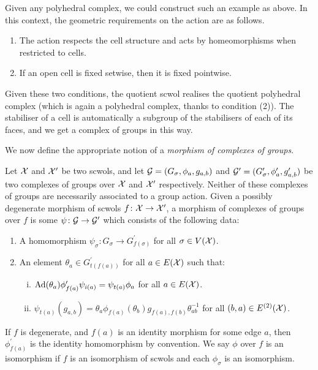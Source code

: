 Given any polyhedral complex, we could construct such an example as above.
In this context, the geometric requirements on the action are as follows.
\begin{enumerate}
	\item The action respects the cell structure and acts by homeomorphisms when restricted to cells.
	\item If an open cell is fixed setwise, then it is fixed pointwise.
\end{enumerate}
Given these two conditions, the quotient scwol realises the quotient polyhedral complex (which is again a polyhedral complex, thanks to condition (2)).
The stabiliser of a cell is automatically a subgroup of the stabilisers of each of its faces, and we get a complex of groups in this way.

We now define the appropriate notion of a \emph{morphism of complexes of groups}.

\begin{definition}
	Let $\mathcal{X}$ and $\mathcal{X}^\prime$ be two scwols, and let $\mathcal{G} = (G_\sigma, \phi_a, g_{a,b})$ and  $\mathcal{G}^\prime = (G^\prime_\sigma, \phi^\prime_a, g^\prime_{a,b})$ be two complexes of groups over $\mathcal{X}$ and $\mathcal{X}^\prime$ respectively.
	Neither of these complexes of groups are necessarily associated to a group action.
	Given a possibly degenerate morphism of scwols $f \colon \mathcal{X} \to \mathcal{X}^\prime$, a morphism of complexes of groups over $f$ is some $\psi  \colon \mathcal{G} \to \mathcal{G}^\prime$ which consists of the following data:
	\begin{enumerate}
		\item A homomorphism $\psi_\sigma \colon G_\sigma \to G^\prime_{f(\sigma)}$ for all $\sigma \in V(\mathcal{X}) $.
		\item An element $\theta_a \in G^\prime_{t(f(a))}$ for all $a \in E(\mathcal{X})$ such that:
		      \begin{enumerate}[(i)]
			      \item $\operatorname{Ad}(\theta_a)\phi'_{f(a)}\psi_{i(a)}=\psi_{t(a)}\phi_a$ for all $a \in E(\mathcal{X})$.
			      \item $\psi_{t(a)}(g_{a,b}) = \theta_a\phi_{f(a)}(\theta_b)g_{f(a),f(b)}\theta_{ab}^{-1}$ for all $(b,a) \in E^{(2)}(\mathcal{X})$.
		      \end{enumerate}
	\end{enumerate}
	If  $f$ is degenerate, and  $f(a)$ is an identity morphism for some edge $a$, then $\phi^\prime_{f(a)}$ is the identity homomorphism by convention.
	We say $\phi$ over $f$ is an isomorphism if $f$ is an isomorphism of scwols and each $\phi_\sigma$ is an isomorphism.
	\label{def:morhpism_of_complexes_of_groups}
\end{definition}

